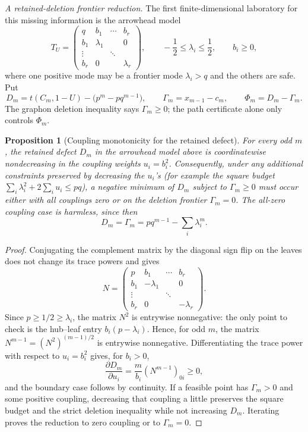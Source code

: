 \documentclass[11pt]{article}
\newtheorem{proposition}[theorem]{Proposition}
\begin{document}
\medskip\noindent\emph{A retained-deletion frontier reduction.}
The first finite-dimensional laboratory for this missing information is the arrowhead model
\[
        T_U=
        \begin{pmatrix}
        q&b_1&\cdots&b_r\\
        b_1&\lambda_1&&0\\
        \vdots&&\ddots&\\
        b_r&0&&\lambda_r
        \end{pmatrix},
        \qquad
        -\frac12\le\lambda_i\le\frac12,\qquad b_i\ge0,
\]
where one positive mode may be a frontier mode $\lambda_i>q$ and the others are safe.  Put
\[
        D_m=t(C_m,1-U)-\bigl(p^m-pq^{m-1}\bigr),
        \qquad
        \Gamma_m=x_{m-1}-c_m,
        \qquad
        \Phi_m=D_m-\Gamma_m .
\]
The graphon deletion inequality says $\Gamma_m\ge0$; the path certificate alone only controls $\Phi_m$.

\begin{proposition}[Coupling monotonicity for the retained defect]\label{prop:retained-monotone}
For every odd $m$, the retained defect $D_m$ in the arrowhead model above is coordinatewise nondecreasing in the coupling weights $u_i=b_i^2$.  Consequently, under any additional constraints preserved by decreasing the $u_i$'s (for example the square budget $\sum_i\lambda_i^2+2\sum_i u_i\le pq$), a negative minimum of $D_m$ subject to $\Gamma_m\ge0$ must occur either with all couplings zero or on the deletion frontier $\Gamma_m=0$.  The all-zero coupling case is harmless, since then
\[
        D_m=\Gamma_m=pq^{m-1}-\sum_i\lambda_i^m .
\]
\end{proposition}

\begin{proof}
Conjugating the complement matrix by the diagonal sign flip on the leaves does not change its trace powers and gives
\[
        N=
        \begin{pmatrix}
        p&b_1&\cdots&b_r\\
        b_1&-\lambda_1&&0\\
        \vdots&&\ddots&\\
        b_r&0&&-\lambda_r
        \end{pmatrix}.
\]
Since $p\ge1/2\ge\lambda_i$, the matrix $N^2$ is entrywise nonnegative: the only point to check is the hub--leaf entry $b_i(p-\lambda_i)$.  Hence, for odd $m$, the matrix $N^{m-1}=(N^2)^{(m-1)/2}$ is entrywise nonnegative.  Differentiating the trace power with respect to $u_i=b_i^2$ gives, for $b_i>0$,
\[
        \frac{\partial D_m}{\partial u_i}
        =\frac{m}{b_i}(N^{m-1})_{0i}\ge0,
\]
and the boundary case follows by continuity.  If a feasible point has $\Gamma_m>0$ and some positive coupling, decreasing that coupling a little preserves the square budget and the strict deletion inequality while not increasing $D_m$.  Iterating proves the reduction to zero coupling or to $\Gamma_m=0$.
\end{proof}
\end{document}

